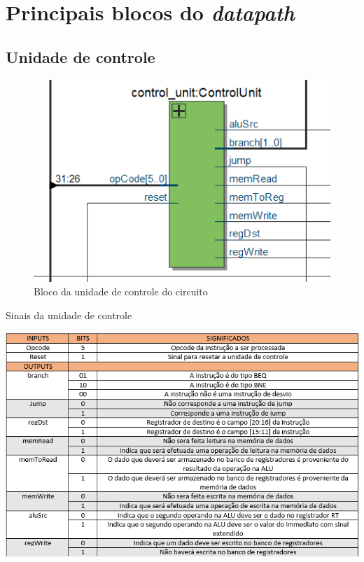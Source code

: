 \documentclass[
	11pt,				%
	openany,			%
	oneside,
	a4paper,			%
	chapter=TITLE,		%
	section=TITLE,		%
	english,			%
	brazil				%
	]{abntex2}
\begin{document}
\section{Principais blocos do \textit{datapath}}
\subsection{Unidade de controle}
\begin{figure}[htb]
	\caption{\label{fig_blococontrol}Bloco da unidade de controle do circuito}
	\begin{center}
	    \includegraphics[scale=0.6]{controlunit.PNG}
	\end{center}
\end{figure}

\begin{table}[htb]
	\caption{\label{tab_tabelacontrol}Sinais da unidade de controle}
	\begin{center}
	    \includegraphics[scale=0.8]{tabela.PNG}
	\end{center}
\end{table}
\end{document}
